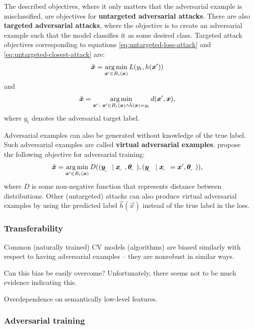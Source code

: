 \documentclass{article}
\begin{document}
The described objectives, where it only matters that the adversarial example is misclassified, are objectives for \textbf{untargeted adversarial attacks}. There are also \textbf{targeted adversarial attacks}, where the objective is to create an adversarial example such that the model classifies it as some desired class. Targeted attack objectives corresponding to equations \eqref{eq:untargeted-loss-attack} and \eqref{eq:untargeted-closest-attack} are:
\begin{align}
    \tilde{\vec x} = \argmin_{\vec x'\in B_\epsilon(\vec x)} L(y_\text{t}, h(\vec x')) \label{eq:targeted-loss-attack}
\end{align}
and
\begin{align}
    \tilde{\vec x} = \argmin_{\vec x'\colon \vec x'\in B_\epsilon(\vec x) \land \hat{h}(\vec x) = y_\text{t}} d(\vec x', \vec x), \label{eq:targeted-closest-attack}
\end{align}
where $y_\text{t}$ denotes the adversarial target label.

Adversarial examples can also be generated without knowledge of the true label. Such adversarial examples are called \textbf{virtual adversarial examples}.
\cite{Miyato:2017:VATRMSSSL} propose the following objective for adversarial training:
\begin{align}
    \tilde{\vec x} = \argmin_{\vec x'\in B_\epsilon(\vec x)} D((\rvec y\mid \rvec x, \rvec\theta), (\rvec y\mid \rvec x = \vec x', \rvec\theta)),  
\end{align}
where $D$ is some non-negative function that represents distance between distributions. Other (untargeted) attacks can also produce virtual adversarial examples by using the predicted label $\hat{h}(\vec x)$ instead of the true label in the loss.

\subsubsection{Transferability}

Common (naturally trained) CV models (algorithms) are biased similarly with respect to having adversarial examples -- they are nonrobust in similar ways. 

Can this bias be easily overcome? Unfortunately, there seems not to be much evidence indicating this.

Overdependence on semantically low-level features.

\subsubsection{Adversarial training}
\end{document}
